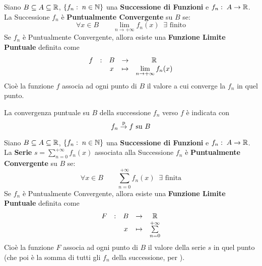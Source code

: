 \begin{definition}
	\label{def:succ_punt_conv}
	Siano $B \subseteq A \subseteq \mathbb{R}$, $\left\{f_n:\; n \in \mathbb{N}\right\}$ una \textbf{Successione di Funzioni} e $f_n:\; A \to \mathbb{R}$.\\
	La Successione $f_n$ è \textbf{Puntualmente Convergente} su $B$ se:
	\[\forall x \in B \qquad \lim\limits_{n \to +\infty} f_n(x) \;\; \exists \text{ finito}\]
	Se $f_n$ è Puntualmente Convergente, allora esiste una \textbf{Funzione Limite Puntuale} definita come
	\[\begin{array}{ccccc} {f} & : & {B} & \to & {\mathbb{R}} \\ & & {x} & \mapsto & {\lim\limits_{n \to +\infty} f_n(x)} \\ \end{array}\]
	Cioè la funzione $f$ associa ad ogni punto di $B$ il valore a cui converge la $f_n$ in quel punto.

	\vspace*{\baselineskip}
	La convergenza puntuale su $B$ della successione $f_n$ verso $f$ è indicata con
	\[f_n \overset{\text{p}}{\to} f \text{ su } B\]
\end{definition}
\begin{definition}
	Siano $B \subseteq A \subseteq \mathbb{R}$, $\left\{f_n:\; n \in \mathbb{N}\right\}$ una \textbf{Successione di Funzioni} e $f_n:\; A \to \mathbb{R}$.\\
	La \textbf{Serie} $s = \sum\limits_{n = 0}^{+\infty} f_n(x)$ associata alla Successione $f_n$ è \textbf{Puntualmente Convergente} su $B$ se:
	\[\forall x \in B \qquad \sum\limits_{n = 0}^{+\infty} f_n(x) \;\; \exists \text{ finita}\]
	Se $f_n$ è Puntualmente Convergente, allora esiste una \textbf{Funzione Limite Puntuale} definita come
	\[\begin{array}{ccccc} {F} & : & {B} & \to & {\mathbb{R}} \\ & & {x} & \mapsto & {\sum\limits_{n = 0}^{+\infty}} \\ \end{array}\]
	Cioè la funzione $F$ associa ad ogni punto di $B$ il valore della serie $s$ in quel punto (che poi è la somma di tutti gli $f_n$ della successione, per ).
\end{definition}
